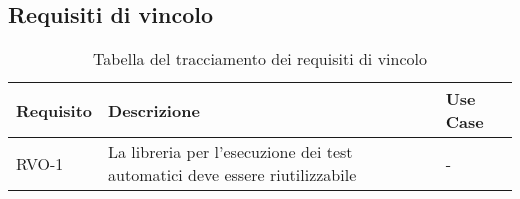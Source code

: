 \subsection{Requisiti di vincolo}
\begin{table}%
    \caption{Tabella del tracciamento dei requisiti di vincolo}
    \label{tab:requisiti-vincolo}
    \begin{tabularx}{\textwidth}{lXl}
        \hline\hline
        \textbf{Requisito} & \textbf{Descrizione}                                                        & \textbf{Use Case} \\
        \hline
        RVO-1              & La libreria per l'esecuzione dei test automatici deve essere riutilizzabile & -                 \\
        \hline
    \end{tabularx}
\end{table}%
